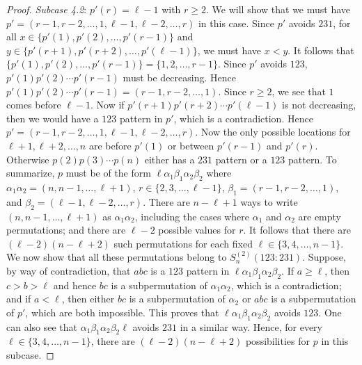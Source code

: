 \documentclass[10pt,a4paper]{amsart}
\numberwithin{equation}{section}
\begin{document}
\begin{proof}
    {\it Subcase 4.2}: $p'(r)=\ell-1$ with $r\geq2$. We will show that we must have $p'=(r-1,r-2,\ldots,1,\ell-1,\ell-2,\ldots,r)$ in this case. Since $p'$ avoids $231$, for all $x\in\{p'(1),p'(2),\ldots,p'(r-1)\}$ and $y\in \{p'(r+1),p'(r+2),\ldots,p'(\ell-1)\}$, we must have $x<y$. 
It follows that $\{p'(1),p'(2),\ldots,p'(r-1)\}=\{1,2,\ldots,r-1\}$. Since $p'$ avoids $123$, $p'(1)p'(2)\cdots p'(r-1)$ must be decreasing.  
Hence $p'(1)p'(2)\cdots p'(r-1)=(r-1,r-2,\ldots,1)$. Since $r\geq2$, we see that $1$ comes before $\ell-1$. Now if $p'(r+1)p'(r+2)\cdots p'(\ell-1)$ is not decreasing, then we would have a $123$ pattern in $p'$, which is a contradiction. Hence $p'=(r-1,r-2,\ldots,1,\ell-1,\ell-2,\ldots,r)$. Now the only possible locations for $\ell+1,\ell+2,\ldots,n$ are before $p'(1)$ or between $p'(r-1)$ and $p'(r)$. 
Otherwise $p(2)p(3)\cdots p(n)$ either has a $231$ pattern or a $123$ pattern. To summarize, $p$ must be of the form $\ell\alpha_1\beta_1\alpha_2\beta_2$ where $\alpha_1\alpha_2=(n,n-1,\ldots,\ell+1)$, $r\in\{2,3,\ldots,\ell-1\}$, $\beta_1=(r-1,r-2,\ldots,1)$, and $\beta_2=(\ell-1,\ell-2,\ldots,r)$. There are $n-\ell+1$ ways to write $(n,n-1,\ldots,\ell+1)$ as $\alpha_1\alpha_2$, including the cases where $\alpha_1$ and $\alpha_2$ are empty permutations; and there are $\ell-2$ possible values for $r$. It follows that there are $(\ell-2)(n-\ell+2)$ such permutations for each fixed $\ell\in\{3,4,\ldots,n-1\}$. We now show that all these permutations belong to $S_n^{(2)}(123:231)$. 
Suppose, by way of contradiction, that $abc$ is a $123$ pattern in $\ell\alpha_1\beta_1\alpha_2\beta_2$. If $a\geq\ell$, then $c>b>\ell$ and hence $bc$ is a subpermutation of $\alpha_1\alpha_2$, which is a contradiction; and if $a<\ell$, then either $bc$ is a subpermutation of $\alpha_2$ or $abc$ is a subpermutation of $p'$, which are both impossible. This proves that $\ell\alpha_1\beta_1\alpha_2\beta_2$ avoids $123$. One can also see that $\alpha_1\beta_1\alpha_2\beta_2\ell$ avoids $231$ in a similar way. Hence, for every $\ell\in\{3,4,\ldots,n-1\}$, there are $(\ell-2)(n-\ell+2)$ possibilities for $p$ in this subcase.



\end{proof}
\end{document}
